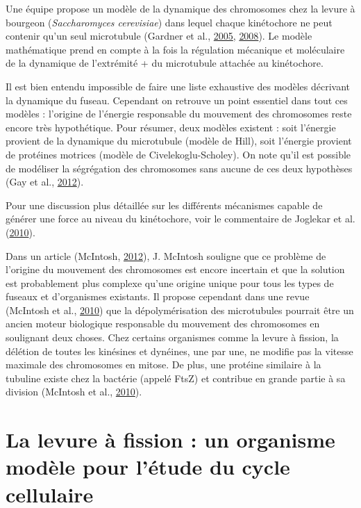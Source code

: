 \documentclass[12pt,a4paper,twoside,openright]{book}
\begin{document}
Une équipe propose un modèle de la dynamique des chromosomes chez la
levure à bourgeon (\emph{Saccharomyces cerevisiae}) dans lequel chaque
kinétochore ne peut contenir qu'un seul microtubule (Gardner et al.,
\protect\hyperlink{ref-Gardner2005}{2005},
\protect\hyperlink{ref-Gardner2008a}{2008}). Le modèle mathématique
prend en compte à la fois la régulation mécanique et moléculaire de la
dynamique de l'extrémité + du microtubule attachée au kinétochore.

Il est bien entendu impossible de faire une liste exhaustive des modèles
décrivant la dynamique du fuseau. Cependant on retrouve un point
essentiel dans tout ces modèles : l'origine de l'énergie responsable du
mouvement des chromosomes reste encore très hypothétique. Pour résumer,
deux modèles existent : soit l'énergie provient de la dynamique du
microtubule (modèle de Hill), soit l'énergie provient de protéines
motrices (modèle de Civelekoglu-Scholey). On note qu'il est possible de
modéliser la ségrégation des chromosomes sans aucune de ces deux
hypothèses (Gay et al., \protect\hyperlink{ref-Gay2012a}{2012}).

Pour une discussion plus détaillée sur les différents mécanismes capable
de générer une force au niveau du kinétochore, voir le commentaire de
Joglekar et al. (\protect\hyperlink{ref-Joglekar2010a}{2010}).

Dans un article (McIntosh, \protect\hyperlink{ref-McIntosh2012}{2012}),
J. McIntosh souligne que ce problème de l'origine du mouvement des
chromosomes est encore incertain et que la solution est probablement
plus complexe qu'une origine unique pour tous les types de fuseaux et
d'organismes existants. Il propose cependant dans une revue (McIntosh et
al., \protect\hyperlink{ref-McIntosh2010}{2010}) que la dépolymérisation
des microtubules pourrait être un ancien moteur biologique responsable
du mouvement des chromosomes en soulignant deux choses. Chez certains
organismes comme la levure à fission, la délétion de toutes les
kinésines et dynéines, une par une, ne modifie pas la vitesse maximale
des chromosomes en mitose. De plus, une protéine similaire à la tubuline
existe chez la bactérie (appelé FtsZ) et contribue en grande partie à sa
division (McIntosh et al., \protect\hyperlink{ref-McIntosh2010}{2010}).

\section{La levure à fission : un organisme modèle pour l'étude du cycle
cellulaire}\label{la-levure-uxe0-fission-un-organisme-moduxe8le-pour-luxe9tude-du-cycle-cellulaire}
\end{document}
